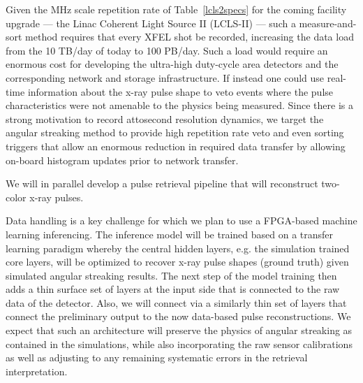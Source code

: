 Given the MHz scale repetition rate of Table~\ref{lcls2specs} for the coming facility upgrade --- the Linac Coherent Light Source II (LCLS-II) --- such a measure-and-sort method requires that every XFEL shot be recorded, increasing the data load from the 10 TB/day of today to 100 PB/day.
Such a load would require an enormous cost for developing the ultra-high duty-cycle area detectors and the corresponding network and storage infrastructure. 
If instead one could use real-time information about the x-ray pulse shape to veto events where the pulse characteristics were not amenable to the physics being measured.
Since there is a strong motivation to record attosecond resolution dynamics, we target the angular streaking method \cite{Nick2018} to provide high repetition rate veto and even sorting triggers that allow an enormous reduction in required data transfer by allowing on-board histogram updates prior to network transfer.

We will in parallel develop a pulse retrieval pipeline that will reconstruct two-color x-ray pulses.

Data handling is a key challenge for which we plan to use a FPGA-based machine learning inferencing.
The inference model will be trained based on a transfer learning paradigm whereby the central hidden layers, e.g. the simulation trained core layers, will be optimized to recover x-ray pulse shapes (ground truth) given simulated angular streaking results.
The next step of the model training then adds a thin surface set of layers at the input side that is connected to the raw data of the detector.
Also, we will connect via a similarly thin set of layers that connect the preliminary output to the now data-based pulse reconstructions.
We expect that such an architecture will preserve the physics of angular streaking as contained in the simulations, while also incorporating the raw sensor calibrations as well as adjusting to any remaining systematic errors in the retrieval interpretation.

